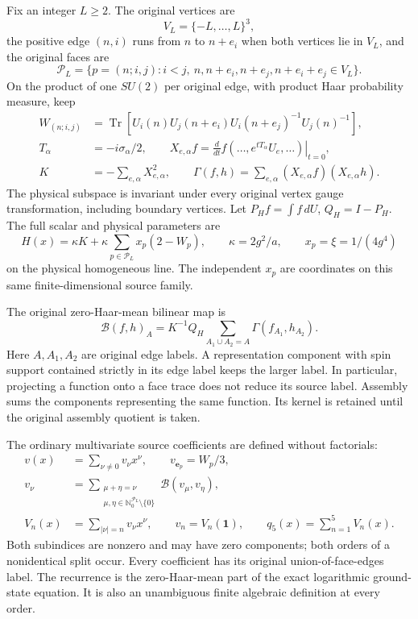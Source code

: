 \documentclass[11pt]{article}
\begin{document}
Fix an integer \(L\ge2\). The original vertices are
\[
 V_L=\{-L,\ldots,L\}^3,
\]
the positive edge \((n,i)\) runs from \(n\) to \(n+e_i\) when both vertices lie in \(V_L\), and the original faces are
\[
 \mathcal P_L=\{p=(n;i,j):i<j,\ n,n+e_i,n+e_j,n+e_i+e_j\in V_L\}.
\]
On the product of one \(SU(2)\) per original edge, with product Haar probability measure, keep
\[
 \begin{aligned}
 W_{(n;i,j)}
 &=\operatorname{Tr}\!\left[
 U_i(n)U_j(n+e_i)U_i(n+e_j)^{-1}U_j(n)^{-1}\right],\\
 T_\alpha&=-i\sigma_\alpha/2,\qquad
 X_{e,\alpha}f=\left.\frac d{dt}f(\ldots,e^{tT_\alpha}U_e,\ldots)\right|_{t=0},\\
 K&=-\sum_{e,\alpha}X_{e,\alpha}^2,\qquad
 \Gamma(f,h)=\sum_{e,\alpha}(X_{e,\alpha}f)(X_{e,\alpha}h).
 \end{aligned}\tag{Q1}
\]
The physical subspace is invariant under every original vertex gauge transformation, including boundary vertices. Let \(P_H f=\int f\,dU\), \(Q_H=I-P_H\). The full scalar and physical parameters are
\[
 H(x)=\kappa K+\kappa\sum_{p\in\mathcal P_L}x_p(2-W_p),\qquad
 \kappa=2g^2/a,\qquad x_p=\xi=1/(4g^4)
 \tag{Q2}
\]
on the physical homogeneous line. The independent \(x_p\) are coordinates on this same finite-dimensional source family.

The original zero-Haar-mean bilinear map is
\[
 \mathcal B(f,h)_A
 =K^{-1}Q_H\!\!\sum_{A_1\cup A_2=A}\Gamma(f_{A_1},h_{A_2}).
 \tag{Q3}
\]
Here \(A,A_1,A_2\) are original edge labels. A representation component with spin support contained strictly in its edge label keeps the larger label. In particular, projecting a function onto a face trace does not reduce its source label. Assembly sums the components representing the same function. Its kernel is retained until the original assembly quotient is taken.

The ordinary multivariate source coefficients are defined without factorials:
\[
 \begin{aligned}
 v(x)&=\sum_{\nu\ne0}v_\nu x^\nu,\qquad
 v_{\mathbf e_p}=W_p/3,\\
 v_\nu&=\sum_{\substack{\mu+\eta=\nu\\
                 \mu,\eta\in\mathbb N_0^{\mathcal P_L}\setminus\{0\}}}
                  \mathcal B(v_\mu,v_\eta),\\
 V_n(x)&=\sum_{|\nu|=n}v_\nu x^\nu,\qquad
 v_n=V_n(\mathbf1),\qquad q_5(x)=\sum_{n=1}^5V_n(x).
 \end{aligned}\tag{Q4}
\]
Both subindices are nonzero and may have zero components; both orders of a nonidentical split occur. Every coefficient has its original union-of-face-edges label. The recurrence is the zero-Haar-mean part of the exact logarithmic ground-state equation. It is also an unambiguous finite algebraic definition at every order.
\end{document}
